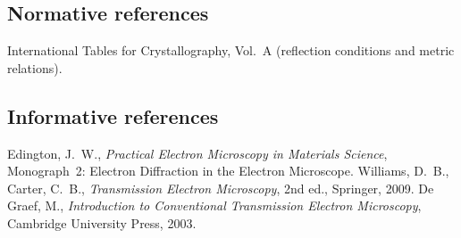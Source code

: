 \subsection*{Normative references}

International Tables for Crystallography, Vol.~A (reflection conditions and metric relations).

\subsection*{Informative references}

Edington, J.~W., \emph{Practical Electron Microscopy in Materials Science}, Monograph~2:
Electron Diffraction in the Electron Microscope.
Williams, D.~B., Carter, C.~B., \emph{Transmission Electron Microscopy}, 2nd ed., Springer, 2009.
De Graef, M., \emph{Introduction to Conventional Transmission Electron Microscopy}, Cambridge
University Press, 2003.
